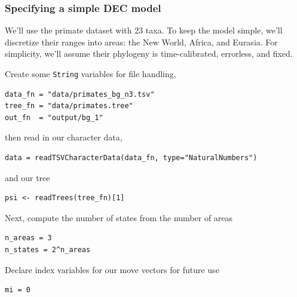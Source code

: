 \subsubsection{Specifying a simple DEC model}

We'll use the primate dataset with 23 taxa. To keep the model simple, we'll discretize their ranges into areas: the New World, Africa, and Eurasia.
For simplicity, we'll assume their phylogeny is time-calibrated, errorless, and fixed.

%

Create some {\tt String} variables for file handling,
\begin{snugshade}
\begin{lstlisting}
data_fn = "data/primates_bg_n3.tsv"
tree_fn = "data/primates.tree"
out_fn  = "output/bg_1"
\end{lstlisting}
\end{snugshade}

then read in our character data,

\begin{snugshade}
\begin{lstlisting}
data = readTSVCharacterData(data_fn, type="NaturalNumbers")
\end{lstlisting}
\end{snugshade}

and our tree

\begin{snugshade}
\begin{lstlisting}
psi <- readTrees(tree_fn)[1]
\end{lstlisting}
\end{snugshade}

Next, compute the number of states from the number of areas

\begin{snugshade}
\begin{lstlisting}
n_areas = 3
n_states = 2^n_areas
\end{lstlisting}
\end{snugshade}

Declare index variables for our move vectors for future use

\begin{snugshade}
\begin{lstlisting}
mi = 0
\end{lstlisting}
\end{snugshade}


